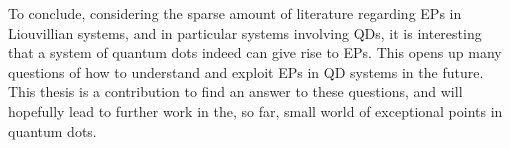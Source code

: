 \documentclass[../main.tex]{subfiles}
\begin{document}
To conclude, considering the sparse amount of literature regarding EPs in Liouvillian systems, and in particular systems involving QDs, it is interesting that a system of quantum dots indeed can give rise to EPs. This opens up many questions of how to understand and exploit EPs in QD systems in the future. This thesis is a contribution to find an answer to these questions, and will hopefully lead to further work in the, so far, small world of exceptional points in quantum dots.
\end{document}
